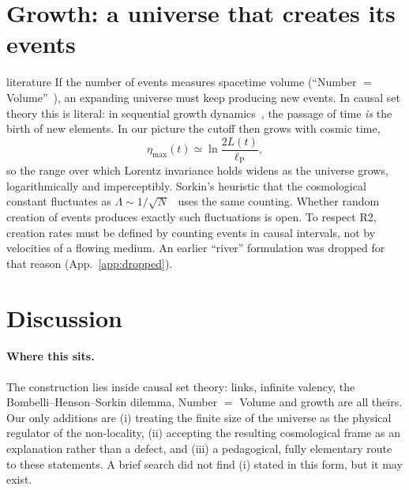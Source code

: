 \documentclass[11pt,a4paper]{article}
\newcommand{\tagbox}[2]{\textsf{\scriptsize\colorbox{#1!12}{\textcolor{#1!70!black}{#2}}}}
\newcommand{\lit}{\tagbox{blue}{literature}}
\newcommand{\lP}{\ell_{\mathrm P}}
\begin{document}
\section{Growth: a universe that creates its events}
\lit{} If the number of events measures spacetime volume (``Number $=$ Volume''~\cite{Surya19}), an expanding universe must keep producing new events. In causal set theory this is literal: in sequential growth dynamics~\cite{RideoutSorkin00}, the passage of time \emph{is} the birth of new elements. In our picture the cutoff then grows with cosmic time,
\begin{equation}
\eta_{\max}(t)\simeq\ln\frac{2L(t)}{\lP},
\end{equation}
so the range over which Lorentz invariance holds widens as the universe grows, logarithmically and imperceptibly. Sorkin's heuristic that the cosmological constant fluctuates as $\Lambda\sim1/\sqrt N$~\cite{ADGS04} uses the same counting. Whether random creation of events produces exactly such fluctuations is open. To respect R2, creation rates must be defined by counting events in causal intervals, not by velocities of a flowing medium. An earlier ``river'' formulation was dropped for that reason (App.~\ref{app:dropped}).

\section{Discussion}
\paragraph{Where this sits.} The construction lies inside causal set theory: links, infinite valency, the Bombelli--Henson--Sorkin dilemma, Number $=$ Volume and growth are all theirs. Our only additions are (i) treating the finite size of the universe as the physical regulator of the non-locality, (ii) accepting the resulting cosmological frame as an explanation rather than a defect, and (iii) a pedagogical, fully elementary route to these statements. A brief search did not find (i) stated in this form, but it may exist.
\end{document}
